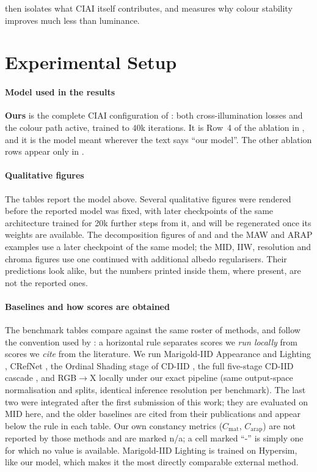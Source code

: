  then isolates what CIAI itself contributes, and
 measures why colour stability improves much less than luminance.


\section{Experimental Setup}
\label{sec:exp_setup}

\paragraph{Model used in the results}
\textbf{Ours} is the complete CIAI configuration of : both
cross-illumination losses and the colour path active, trained to $40$k iterations. It is
Row~4 of the ablation in , and it is the model meant wherever the text
says ``our model''. The other ablation rows appear only in .

\paragraph{Qualitative figures}
The tables report the model above. Several qualitative figures were rendered before the
reported model was fixed, with later checkpoints of the same architecture trained for 20k
further steps from it, and will be regenerated once its weights are available. The
decomposition figures of  and  and the MAW and ARAP
examples use a later checkpoint of the same model; the MID, IIW, resolution and chroma figures use one continued with
additional albedo regularisers. Their predictions look alike, but the numbers printed inside
them, where present, are not the reported ones.

\paragraph{Baselines and how scores are obtained}
The benchmark tables compare against the same roster of methods, and follow the
convention used by : a horizontal rule separates scores
we \emph{run locally} from scores we \emph{cite} from the literature.
We run Marigold-IID Appearance and Lighting ,
CRefNet , the Ordinal Shading stage of CD-IID
, the full five-stage CD-IID cascade
, and RGB$\rightarrow$X  locally under our
exact pipeline (same output-space normalisation and splits, identical inference
resolution per benchmark). The last two were integrated after the first submission of
this work; they are evaluated on MID here, and the older baselines are cited from their
publications and appear below the rule in each table. Our own constancy metrics ($C_{\text{mat}}$, $C_{\text{arap}}$) are not reported by
those methods and are marked n/a; a cell marked ``-'' is simply one for which no value
is available.
Marigold-IID Lighting is trained on Hypersim, like our model, which makes it
the most directly comparable external method.

